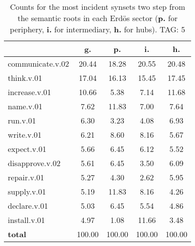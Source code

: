 \begin{table}[h!]
\begin{center}
\begin{tabular}{| l || c | c | c | c |}\hline
 & {\bf g.} & {\bf p.} & {\bf i.} & {\bf h.} \\\hline\hline
communicate.v.02 & 20.44  & 18.28  & 20.55  & 20.48 \\\hline
think.v.01 & 17.04  & 16.13  & 15.45  & 17.45 \\\hline
increase.v.01 & 10.66  & 5.38  & 7.14  & 11.68 \\\hline
name.v.01 & 7.62  & 11.83  & 7.00  & 7.64 \\\hline
run.v.01 & 6.30  & 3.23  & 4.08  & 6.93 \\\hline
write.v.01 & 6.21  & 8.60  & 8.16  & 5.67 \\\hline
expect.v.01 & 5.66  & 6.45  & 6.12  & 5.52 \\\hline
disapprove.v.02 & 5.61  & 6.45  & 3.50  & 6.09 \\\hline
repair.v.01 & 5.27  & 4.30  & 2.62  & 5.95 \\\hline
supply.v.01 & 5.19  & 11.83  & 8.16  & 4.26 \\\hline
declare.v.01 & 5.03  & 6.45  & 5.54  & 4.86 \\\hline
install.v.01 & 4.97  & 1.08  & 11.66  & 3.48 \\\hline\hline
{{\bf total}} & 100.00  & 100.00  & 100.00  & 100.00 \\\hline
\end{tabular}
\caption{Counts for the most incident synsets two step from the semantic roots in each Erd\"os sector ({\bf p.} for periphery, {\bf i.} for intermediary, {\bf h.} for hubs). TAG: 5}
\end{center}
\end{table}